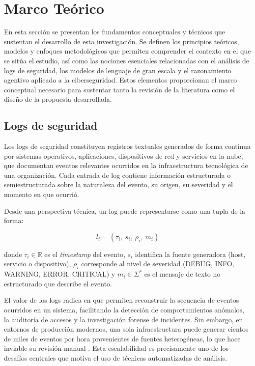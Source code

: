 \chapter{Marco Teórico}

En esta sección se presentan los fundamentos conceptuales y técnicos que sustentan el desarrollo de esta investigación. Se definen los principios teóricos, modelos y enfoques metodológicos que permiten comprender el contexto en el que se sitúa el estudio, así como las nociones esenciales relacionadas con el análisis de logs de seguridad, los modelos de lenguaje de gran escala y el razonamiento agentivo aplicado a la ciberseguridad. Estos elementos proporcionan el marco conceptual necesario para sustentar tanto la revisión de la literatura como el diseño de la propuesta desarrollada.

\section{Logs de seguridad}

Los logs de seguridad constituyen registros textuales generados de forma continua por sistemas operativos, aplicaciones, dispositivos de red y servicios en la nube, que documentan eventos relevantes ocurridos en la infraestructura tecnológica de una organización. Cada entrada de log contiene información estructurada o semiestructurada sobre la naturaleza del evento, su origen, su severidad y el momento en que ocurrió.

Desde una perspectiva técnica, un log puede representarse como una tupla de la forma:

\begin{equation}
    l_i = (\tau_i,\ s_i,\ \rho_i,\ m_i)
\end{equation}

\noindent donde $\tau_i \in \mathbb{R}$ es el \textit{timestamp} del evento, $s_i$ identifica la fuente generadora (host, servicio o dispositivo), $\rho_i$ corresponde al nivel de severidad (DEBUG, INFO, WARNING, ERROR, CRITICAL) y $m_i \in \Sigma^*$ es el mensaje de texto no estructurado que describe el evento.

El valor de los logs radica en que permiten reconstruir la secuencia de eventos ocurridos en un sistema, facilitando la detección de comportamientos anómalos, la auditoría de accesos y la investigación forense de incidentes. Sin embargo, en entornos de producción modernos, una sola infraestructura puede generar cientos de miles de eventos por hora provenientes de fuentes heterogéneas, lo que hace inviable su revisión manual \cite{palma2025llm}. Esta escalabilidad es precisamente uno de los desafíos centrales que motiva el uso de técnicas automatizadas de análisis.


